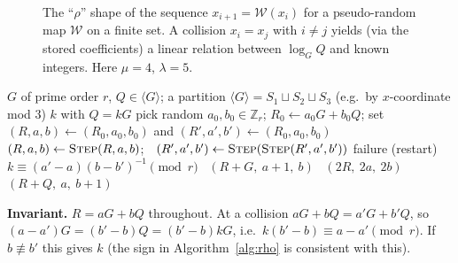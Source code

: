 \documentclass[11pt,a4paper,oneside]{book}
\theoremstyle{plain}
\theoremstyle{definition}
\theoremstyle{remark}
\newcommand{\Z}{\mathbb{Z}}
\newcommand{\R}{\mathbb{R}}
\newcommand{\ECDLP}{\mathsf{ECDLP}}
\begin{document}
\begin{figure}[ht]
\centering
{}
\caption{The ``$\rho$'' shape of the sequence $x_{i+1}=\mathcal W(x_i)$ for a pseudo-random map $\mathcal W$ on a finite set. A collision $x_i=x_j$ with $i\neq j$ yields (via the stored coefficients) a linear relation between $\log_GQ$ and known integers. Here $\mu=4$, $\lambda=5$.}
\label{fig:rho}
\end{figure}

\begin{algorithm}[ht]
\caption{Pollard's rho for $\ECDLP$ (Floyd cycle finding, 3-partition walk)}\label{alg:rho}
\begin{algorithmic}[1]
\Require $G$ of prime order $r$, $Q\in\langle G\rangle$; a partition $\langle G\rangle=S_1\sqcup S_2\sqcup S_3$ (e.g.\ by $x$-coordinate mod $3$)
\Ensure $k$ with $Q=kG$
\State pick random $a_0,b_0\in\Z_r$; $R_0\gets a_0G+b_0Q$; set $(R,a,b)\gets(R_0,a_0,b_0)$ and $(R',a',b')\gets(R_0,a_0,b_0)$
\Repeat
  \State $(R,a,b)\gets\textsc{Step}(R,a,b)$;\ \ $(R',a',b')\gets\textsc{Step}(\textsc{Step}(R',a',b'))$
 \Return failure (restart)\EndIf
\State \Return $k\equiv(a'-a)(b-b')^{-1}\pmod r$
\Statex
{}
  \ \Return $(R+G,\ a+1,\ b)$
  \ \Return $(2R,\ 2a,\ 2b)$
  \Else\ \Return $(R+Q,\ a,\ b+1)$ \EndIf
\EndFunction
\end{algorithmic}
\end{algorithm}

\textbf{Invariant.} $R=aG+bQ$ throughout. At a collision $aG+bQ=a'G+b'Q$, so $(a-a')G=(b'-b)Q=(b'-b)kG$, i.e.\ $k(b'-b)\equiv a-a'\pmod r$. If $b\not\equiv b'$ this gives $k$ (the sign in Algorithm~\ref{alg:rho} is consistent with this).
\end{document}
